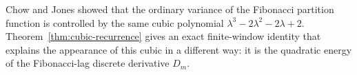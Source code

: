 \begin{remark}
\label{rem:chow-jones}
Chow and Jones \cite{ChowJones2024} showed that the ordinary variance of the
Fibonacci partition function is controlled by the same cubic polynomial
\(\lambda^3-2\lambda^2-2\lambda+2\).  Theorem~\ref{thm:cubic-recurrence} gives
an exact finite-window identity that explains the appearance of this cubic in a
different way: it is the quadratic energy of the Fibonacci-lag discrete
derivative \(D_m\).
\end{remark}
